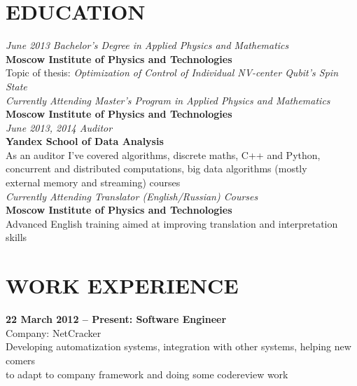 \documentclass[margin,12pt]{res}
\begin{document}
  \address{28a Pervomayskaya Street, Dolgoprudny, Russian Federation\\
    kremsnx@gmail.com\\
    valery.ovchinnikov@phystech.edu\\
    +7 (985) 964-85-12}

\begin{resume}
\section{EDUCATION} 
\textit{June 2013 Bachelor's Degree in Applied Physics and Mathematics\\}
\textbf{Moscow Institute of Physics and Technologies}\\
Topic of thesis: \textit{Optimization of Control of Individual NV-center Qubit's Spin State}\\
\newline
\textit{Currently Attending Master's Program in Applied Physics and Mathematics\\}
\textbf{Moscow Institute of Physics and Technologies}\\
\newline
\textit{June 2013, 2014 Auditor\\}
\textbf{Yandex School of Data Analysis}\\
As an auditor I've covered algorithms, discrete maths, C++ and Python,\\
 concurrent and distributed computations, big data algorithms (mostly\\
 external memory and streaming) courses\\
\newline
\textit{Currently Attending Translator (English/Russian) Courses\\}
\textbf{Moscow Institute of Physics and Technologies}\\
Advanced English training aimed at improving translation and
interpretation skills
\section{WORK EXPERIENCE} 
\textbf{22 March 2012 -- Present: Software Engineer}\\
Company: NetCracker\\
Developing automatization systems, integration with other systems, helping new
comers\\
 to adapt to company framework and doing some codereview work

\end{resume}
\end{document}
